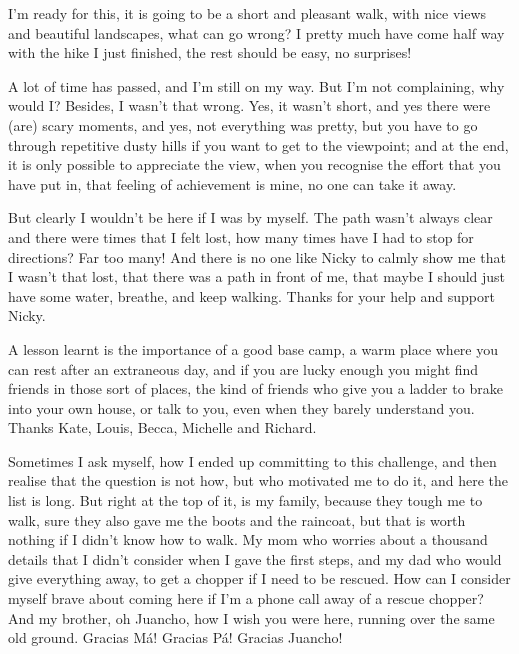 

\vspace{3mm}

I'm ready for this, it is going to be a short and pleasant walk, with nice views and beautiful landscapes, what can go wrong? I pretty much have come half way with the hike I just finished, the rest should be easy, no surprises!

A lot of time has passed, and I'm still on my way. But I'm not complaining, why would I? Besides, I wasn't that wrong. Yes, it wasn't short, and yes there were (are) scary moments, and yes, not everything was pretty, but you have to go through repetitive dusty hills if you want to get to the viewpoint; and at the end, it is only possible to appreciate the view, when you recognise the effort that you have put in, that feeling of achievement is mine, no one can take it away. 

But clearly I wouldn't be here if I was by myself. The path wasn't always clear and there were times that I felt lost, how many times have I had to stop for directions? Far too many! And there is no one like Nicky to calmly show me that I wasn't that lost, that there was a path in front of me, that maybe I should just have some water, breathe, and keep walking. Thanks for your help and support Nicky.

A lesson learnt is the importance of a good base camp, a warm place where you can rest after an extraneous day, and if you are lucky enough you might find friends in those sort of places, the kind of friends who give you a ladder to brake into your own house, or talk to you, even when they barely understand you. Thanks Kate, Louis, Becca, Michelle and Richard.

\vspace{3mm}

Sometimes I ask myself, how I ended up committing to this challenge, and then realise that the question is not how, but who motivated me to do it, and here the list is long. But right at the top of it, is my family, because they tough me to walk, sure they also gave me the boots and the raincoat, but that is worth nothing if I didn't know how to walk. My mom who worries about a thousand details that I didn't consider when I gave the first steps, and my dad who would give everything away, to get a chopper if I need to be rescued. How can I consider myself brave about coming here if I'm a phone call away of a rescue chopper? And my brother, oh Juancho, how I wish you were here, running over the same old ground. Gracias M\'a! Gracias P\'a! Gracias Juancho!

